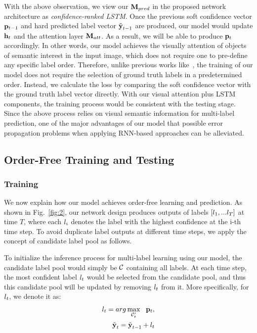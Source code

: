 \documentclass[letterpaper]{article} %
\begin{document}
With the above observation, we view our $\mathbf{M}_{pred}$ in the proposed network architecture as \emph{confidence-ranked LSTM}. Once the previous soft confidence vector $\mathbf{p}_{t-1}$ and hard predicted label vector $\tilde{\textbf{y}}_{t-1}$ are produced, our model would update $\mathbf{h}_t$ and the attention layer $\mathbf{M}_{att}$. As a result, we will be able to produce $\mathbf{p}_{t}$ accordingly. In other words, our model achieves the visually attention of objects of semantic interest in the input image, which does not require one to pre-define any specific label order. Therefore, unlike previous works like~\cite{wang2016cnn}, the training of our model does not require the selection of ground truth labels in a predetermined order. Instead, we calculate the loss by comparing the soft confidence vector with the ground truth label vector directly. With our visual attention plus LSTM components, the training process would be consistent with the testing stage. Since the above process relies on visual semantic information for multi-label prediction, one of the major advantages of our model that possible error propagation problems when applying RNN-based approaches can be alleviated.

\subsection{Order-Free Training and Testing}
\subsubsection{Training}

We now explain how our model achieves order-free learning and prediction. As shown in Fig.~\ref{fig:2}, our network design produces outputs of labels ${[l_1, ... l_T]}$ at time $T$, where each $l_i$ denotes the label with the highest confidence at the i-th time step. To avoid duplicate label outputs at different time steps, we apply the concept of candidate label pool as follows.

To initialize the inference process for multi-label learning using our model, the candidate label pool would simply be $\mathcal{C}$ containing all labels. At each time step, the most confident label $l_t$ would be selected from the candidate pool, and thus this candidate pool will be updated by removing $l_t$ from it. More specifically, for $l_t$, we denote it as:
\begin{equation}
\label{eq:max}
\begin{aligned}
l_t = arg\max_{\mathcal{C}'_t}~~\mathbf{p}_t, \\
\tilde{\textbf{y}}_t = \tilde{\textbf{y}}_{t-1} + l_t
\end{aligned}
\end{equation}
\end{document}
